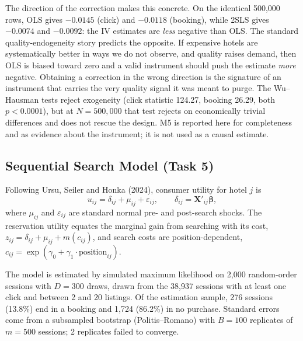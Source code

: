 \documentclass[11pt]{article}
\begin{document}
The direction of the correction makes this concrete. On the identical 500,000
rows, OLS gives $-0.0145$ (click) and $-0.0118$ (booking), while 2SLS gives
$-0.0074$ and $-0.0092$: the IV estimates are \emph{less} negative than OLS.
The standard quality-endogeneity story predicts the opposite. If expensive
hotels are systematically better in ways we do not observe, and quality raises
demand, then OLS is biased toward zero and a valid instrument should push the
estimate \emph{more} negative. Obtaining a correction in the wrong direction is
the signature of an instrument that carries the very quality signal it was
meant to purge. The Wu--Hausman tests reject exogeneity (click statistic
124.27, booking 26.29, both $p<0.0001$), but at $N=500{,}000$ that test rejects
on economically trivial differences and does not rescue the design. M5 is
reported here for completeness and as evidence about the instrument; it is not
used as a causal estimate.

\subsection{Sequential Search Model (Task 5)}

Following Ursu, Seiler and Honka (2024), consumer utility for hotel $j$ is
%
\begin{equation}
u_{ij} = \delta_{ij} + \mu_{ij} + \varepsilon_{ij},
\qquad \delta_{ij} = \mathbf{X}'_{ij}\boldsymbol{\beta},
\end{equation}
%
where $\mu_{ij}$ and $\varepsilon_{ij}$ are standard normal pre- and
post-search shocks. The reservation utility equates the marginal gain from
searching with its cost, $z_{ij} = \delta_{ij} + \mu_{ij} + m(c_{ij})$, and
search costs are position-dependent,
$c_{ij} = \exp(\gamma_0 + \gamma_1 \cdot \text{position}_{ij})$.

The model is estimated by simulated maximum likelihood on 2,000 random-order
sessions with $D = 300$ draws, drawn from the 38,937 sessions with at least one
click and between 2 and 20 listings. Of the estimation sample, 276 sessions
(13.8\%) end in a booking and 1,724 (86.2\%) in no purchase. Standard errors
come from a subsampled bootstrap (Politis--Romano) with $B = 100$ replicates of
$m = 500$ sessions; 2 replicates failed to converge.
\end{document}
